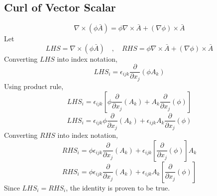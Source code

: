 \subsection{Curl of Vector Scalar}
\begin{comment}
\end{comment}
$$\nabla\times(\phi\bar{A}) = \phi\nabla\times\bar{A} + (\nabla\phi)\times\bar{A}$$
Let
$$LHS = \nabla\times(\phi\bar{A}) \quad,\quad RHS = \phi\nabla\times\bar{A} + (\nabla\phi)\times\bar{A}$$
Converting $LHS$ into index notation,
$$LHS_{i} = \epsilon_{ijk}\frac{\partial}{\partial x_{j}}(\phi A_{k})$$
Using product rule,
$$LHS_{i} = \epsilon_{ijk}\left[\phi\frac{\partial}{\partial x_{j}}( A_{k}) + A_{k}\frac{\partial}{\partial x_{j}}(\phi )\right]$$
$$LHS_{i} = \epsilon_{ijk}\phi\frac{\partial}{\partial x_{j}}( A_{k}) + \epsilon_{ijk}A_{k}\frac{\partial}{\partial x_{j}}(\phi)$$
Converting $RHS$ into index notation,
$$RHS_{i} = \phi\epsilon_{ijk}\frac{\partial}{\partial x_{j}}(A_{k}) + \epsilon_{ijk}\left[\frac{\partial}{\partial x_{j}}(\phi)\right]A_{k}$$
$$RHS_{i} = \phi\epsilon_{ijk}\frac{\partial}{\partial x_{j}}(A_{k}) + \epsilon_{ijk}A_{k}\left[\frac{\partial}{\partial x_{j}}(\phi)\right]$$
Since $LHS_{i} = RHS_{i}$, the identity is proven to be true.

